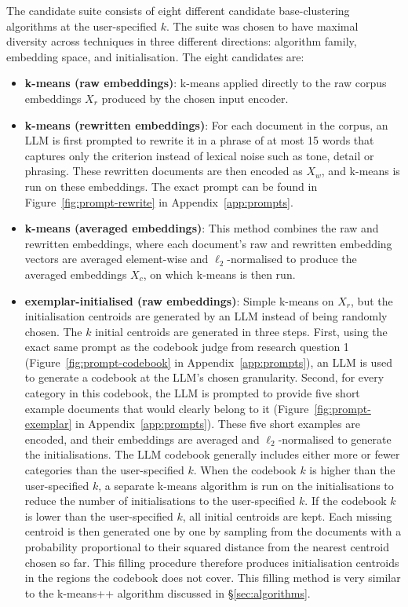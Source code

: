 \documentclass[11pt,a4paper,oneside]{report}
\begin{document}
The candidate suite consists of eight different candidate base-clustering algorithms at the user-specified $k$. The suite was chosen to have maximal diversity across techniques in three different directions: algorithm family, embedding space, and initialisation. The eight candidates are:
\begin{itemize}
\item \textbf{k-means (raw embeddings)}: k-means applied directly to the raw corpus embeddings $X_r$ produced by the chosen input encoder.
\item \textbf{k-means (rewritten embeddings)}: For each document in the corpus, an LLM is first prompted to rewrite it in a phrase of at most 15 words that captures only the criterion instead of lexical noise such as tone, detail or phrasing. These rewritten documents are then encoded as $X_w$, and k-means is run on these embeddings. The exact prompt can be found in Figure~\ref{fig:prompt-rewrite} in Appendix~\ref{app:prompts}.
\item \textbf{k-means (averaged embeddings)}: This method combines the raw and rewritten embeddings, where each document's raw and rewritten embedding vectors are averaged element-wise and $\ell_2$-normalised to produce the averaged embeddings $X_c$, on which k-means is then run.
\item \textbf{exemplar-initialised (raw embeddings)}: Simple k-means on $X_r$, but the initialisation centroids are generated by an LLM instead of being randomly chosen. The $k$ initial centroids are generated in three steps. First, using the exact same prompt as the codebook judge from research question 1 (Figure~\ref{fig:prompt-codebook} in Appendix~\ref{app:prompts}), an LLM is used to generate a codebook at the LLM's chosen granularity. Second, for every category in this codebook, the LLM is prompted to provide five short example documents that would clearly belong to it (Figure~\ref{fig:prompt-exemplar} in Appendix~\ref{app:prompts}). These five short examples are encoded, and their embeddings are averaged and $\ell_2$-normalised to generate the initialisations. The LLM codebook generally includes either more or fewer categories than the user-specified $k$. When the codebook $k$ is higher than the user-specified $k$, a separate k-means algorithm is run on the initialisations to reduce the number of initialisations to the user-specified $k$. If the codebook $k$ is lower than the user-specified $k$, all initial centroids are kept. Each missing centroid is then generated one by one by sampling from the documents with a probability proportional to their squared distance from the nearest centroid chosen so far. This filling procedure therefore produces initialisation centroids in the regions the codebook does not cover. This filling method is very similar to the k-means++ algorithm discussed in \S\ref{sec:algorithms}.

\end{itemize}
\end{document}
